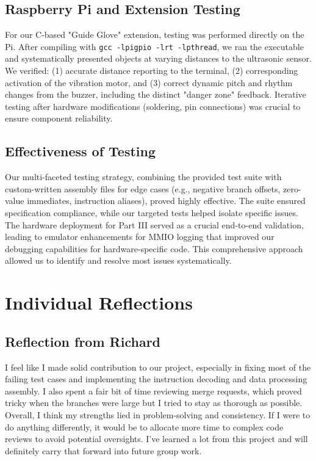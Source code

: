 \documentclass[11pt]{article}
\begin{document}
\subsection{Raspberry Pi and Extension Testing}
For our C-based "Guide Glove" extension, testing was performed directly on the Pi. After compiling with \texttt{gcc -lpigpio -lrt -lpthread}, we ran the executable and systematically presented objects at varying distances to the ultrasonic sensor. We verified: (1) accurate distance reporting to the terminal, (2) corresponding activation of the vibration motor, and (3) correct dynamic pitch and rhythm changes from the buzzer, including the distinct "danger zone" feedback. Iterative testing after hardware modifications (soldering, pin connections) was crucial to ensure component reliability.

\subsection{Effectiveness of Testing}
Our multi-faceted testing strategy, combining the provided test suite with custom-written assembly files for edge cases (e.g., negative branch offsets, zero-value immediates, instruction aliases), proved highly effective. The suite ensured specification compliance, while our targeted tests helped isolate specific issues. The hardware deployment for Part III served as a crucial end-to-end validation, leading to emulator enhancements for MMIO logging that improved our debugging capabilities for hardware-specific code. This comprehensive approach allowed us to identify and resolve most issues systematically.

\section{Individual Reflections}
\subsection{Reflection from Richard}
I feel like I made solid contribution to our project, especially in fixing most of the failing test cases and implementing the 
instruction decoding and data processing assembly. I also spent a fair bit of time reviewing merge requests, which proved tricky 
when the branches were large but I tried to stay as thorough as possible. Overall, I think my strengths lied in problem-solving and 
consistency. If I were to do anything differently, it would be to allocate more time to complex code 
reviews to avoid potential oversights. I've learned a lot from this project and will definitely carry that forward into future group work.
\end{document}
